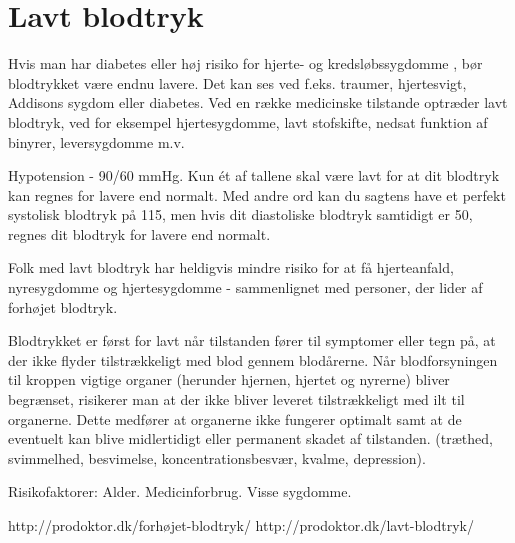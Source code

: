 \section{Lavt blodtryk} 
 Hvis man har diabetes eller høj risiko for hjerte- og kredsløbssygdomme , bør blodtrykket være endnu lavere. Det kan ses ved f.eks. traumer, hjertesvigt, Addisons sygdom  eller diabetes.
Ved en række medicinske tilstande optræder lavt blodtryk, ved for eksempel hjertesygdomme, lavt stofskifte, nedsat funktion af binyrer, leversygdomme m.v.
 
Hypotension - 90/60 mmHg. Kun ét af tallene skal være lavt for at dit blodtryk kan regnes for lavere end normalt. Med andre ord kan du sagtens have et perfekt systolisk blodtryk på 115, men hvis dit diastoliske blodtryk samtidigt er 50, regnes dit blodtryk for lavere end normalt.

Folk med lavt blodtryk har heldigvis mindre risiko for at få hjerteanfald, nyresygdomme og hjertesygdomme - sammenlignet med personer, der lider af forhøjet blodtryk.

Blodtrykket er først for lavt når tilstanden fører til symptomer eller tegn på, at der ikke flyder tilstrækkeligt med blod gennem blodårerne. Når blodforsyningen til kroppen vigtige organer (herunder hjernen, hjertet og nyrerne) bliver begrænset, risikerer man at der ikke bliver leveret tilstrækkeligt med ilt til organerne. Dette medfører at organerne ikke fungerer optimalt samt at de eventuelt kan blive midlertidigt eller permanent skadet af tilstanden. (træthed, svimmelhed, besvimelse, koncentrationsbesvær, kvalme, depression).  

Risikofaktorer: 
Alder. Medicinforbrug. Visse sygdomme.

http://prodoktor.dk/forhøjet-blodtryk/
http://prodoktor.dk/lavt-blodtryk/ 


